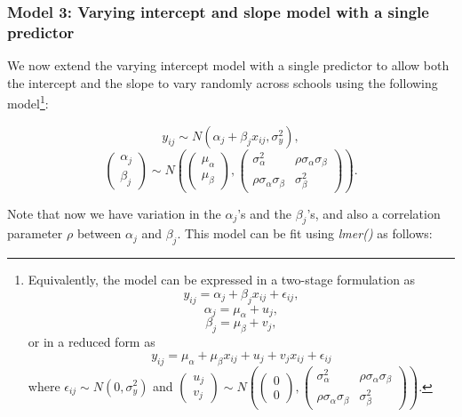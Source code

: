 \subsubsection*{Model 3: Varying intercept and slope model with a single predictor}
We now extend the varying intercept model with a single predictor to allow both the intercept and the slope to vary randomly across schools using the following model\footnote{Equivalently, the model can be expressed in a two-stage formulation as $$y_{ij} = \alpha_j + \beta_j x_{ij} +\epsilon_{ij},$$ $$\alpha_j = \mu_\alpha + u_j,$$ $$\beta_j = \mu_\beta + v_j,$$ or in a reduced form as $$y_{ij} = \mu_\alpha + \mu_\beta x_{ij} + u_j + v_j x_{ij} + \epsilon_{ij}$$ where $\epsilon_{ij} \sim N(0, \sigma_{y}^{2})$ and $\left( \begin{matrix} u_j \\ v_j \end{matrix} \right) \sim N\left( \left( \begin{matrix} 0 \\ 0 \end{matrix} \right) ,\left( \begin{matrix} { \sigma  }_{ \alpha  }^{ 2 } & \rho { \sigma  }_{ \alpha  }{ \sigma  }_{ \beta  } \\ \rho { \sigma  }_{ \alpha  }{ \sigma  }_{ \beta  } & { \sigma  }_{ \beta  }^{ 2 } \end{matrix} \right)  \right)$.}:

$$y_{ij}\sim N(\alpha_{j}+\beta_{j}x_{ij} , \sigma_y ^2 ),$$ $$\left( \begin{matrix} \alpha _{ j } \\ \beta _{ j } \end{matrix} \right) \sim N\left( \left( \begin{matrix} { \mu  }_{ \alpha  } \\ { \mu  }_{ \beta  } \end{matrix} \right) , \left( \begin{matrix} { \sigma  }_{ \alpha  }^{ 2 } & \rho { \sigma  }_{ \alpha  }{ \sigma  }_{ \beta  } \\ \rho { \sigma  }_{ \alpha  }{ \sigma  }_{ \beta  } & { \sigma  }_{ \beta  }^{ 2 } \end{matrix} \right)  \right).$$

Note that now we have variation in the $\alpha_{j}$'s and the $\beta_{j}$'s, and also a correlation parameter $\rho$ between $\alpha_j$ and $\beta_j$. This model can be fit using \textit{lmer()} as follows:


